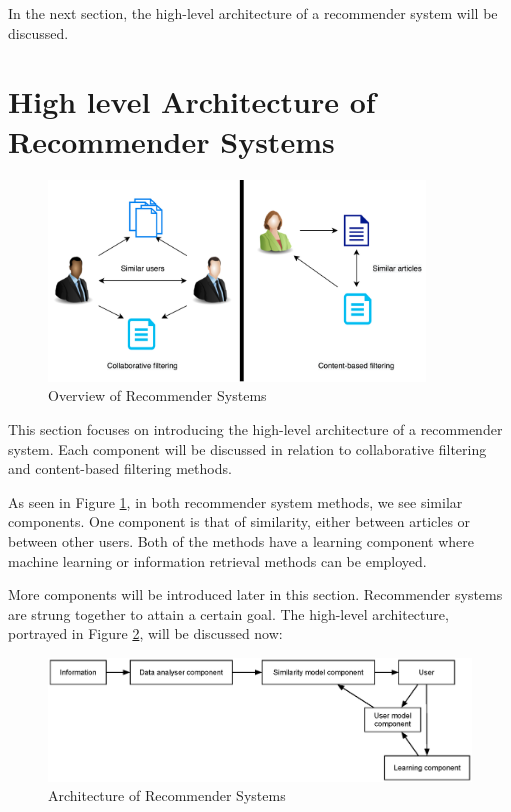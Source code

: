 In the next section, the high-level architecture of a recommender system will be discussed.






\section{High level Architecture of Recommender Systems}

\begin{figure}[htbp]
\centering
\includegraphics[width=10cm]{./figures/overviewRS1.png}
\caption{Overview of Recommender Systems}
\label{fig:OverviewRS}
\end{figure}

This section focuses on introducing the high-level architecture of a recommender system. Each component will be discussed in relation to collaborative filtering and content-based filtering methods.

As seen in Figure \ref{fig:OverviewRS}, in both recommender system methods, we see similar components. One component is that of similarity, either between articles or between other users. Both of the methods have a learning component where machine learning or information retrieval methods can be employed.

More components will be introduced later in this section. Recommender systems are strung together to attain a certain goal. The high-level architecture, portrayed in Figure \ref{fig:archRS}, will be discussed now:

\begin{figure}[htbp]
\centering
\includegraphics[width=12cm]{./figures/arch12.eps}
\caption{Architecture of Recommender Systems}
\label{fig:archRS}
\end{figure}

